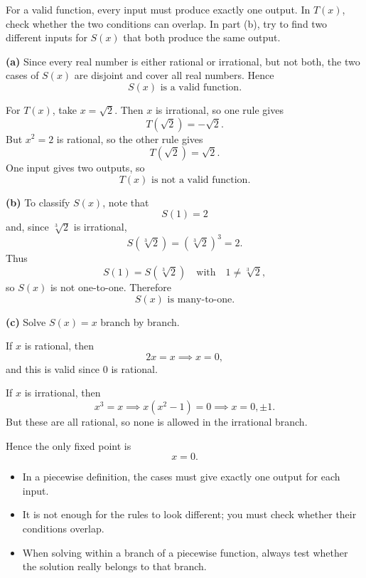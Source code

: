 \begin{hint}
For a valid function, every input must produce exactly one output. In $T(x)$, check whether the two conditions can overlap. In part (b), try to find two different inputs for $S(x)$ that both produce the same output.
\end{hint}

\begin{solution}
\textbf{(a)} Since every real number is either rational or irrational, but not both, the two cases of $S(x)$ are disjoint and cover all real numbers. Hence
\[
\boxed{S(x)\text{ is a valid function}.}
\]

For $T(x)$, take $x=\sqrt2$. Then $x$ is irrational, so one rule gives
\[
T(\sqrt2)=-\sqrt2.
\]
But $x^2=2$ is rational, so the other rule gives
\[
T(\sqrt2)=\sqrt2.
\]
One input gives two outputs, so
\[
\boxed{T(x)\text{ is not a valid function}.}
\]

\textbf{(b)} To classify $S(x)$, note that
\[
S(1)=2
\]
and, since $\sqrt[3]{2}$ is irrational,
\[
S(\sqrt[3]{2})=(\sqrt[3]{2})^3=2.
\]
Thus
\[
S(1)=S(\sqrt[3]{2}) \quad \text{with} \quad 1\ne \sqrt[3]{2},
\]
so $S(x)$ is not one-to-one. Therefore
\[
\boxed{S(x)\text{ is many-to-one}.}
\]

\textbf{(c)} Solve $S(x)=x$ branch by branch.

If $x$ is rational, then
\[
2x=x \implies x=0,
\]
and this is valid since $0$ is rational.

If $x$ is irrational, then
\[
x^3=x \implies x(x^2-1)=0 \implies x=0,\pm1.
\]
But these are all rational, so none is allowed in the irrational branch.

Hence the only fixed point is
\[
\boxed{x=0.}
\]
\end{solution}

\begin{takeaways}
\begin{itemize}[leftmargin=*]
\item In a piecewise definition, the cases must give exactly one output for each input.
\item It is not enough for the rules to look different; you must check whether their conditions overlap.
\item When solving within a branch of a piecewise function, always test whether the solution really belongs to that branch.
\end{itemize}
\end{takeaways}

